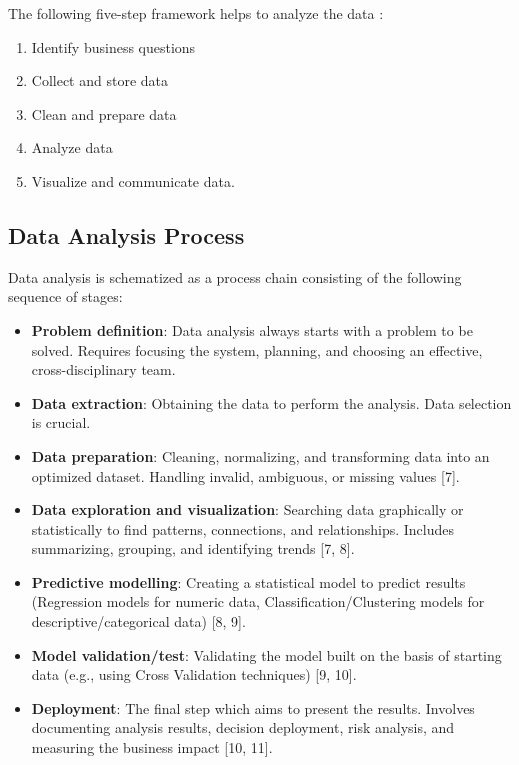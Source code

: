\documentclass[
  letterpaper,
  DIV=11,
  numbers=noendperiod]{scrreprt}
\providecommand{\tightlist}{%
  \setlength{\itemsep}{0pt}\setlength{\parskip}{0pt}}
\begin{document}
The following five-step framework helps to analyze the data :

\begin{enumerate}
\def\labelenumi{\arabic{enumi}.}
\tightlist
\item
  Identify business questions
\item
  Collect and store data
\item
  Clean and prepare data
\item
  Analyze data
\item
  Visualize and communicate data.
\end{enumerate}

\subsection{Data Analysis Process}\label{data-analysis-process}

Data analysis is schematized as a process chain consisting of the
following sequence of stages:

\begin{itemize}
\tightlist
\item
  \textbf{Problem definition}: Data analysis always starts with a
  problem to be solved. Requires focusing the system, planning, and
  choosing an effective, cross-disciplinary team.
\item
  \textbf{Data extraction}: Obtaining the data to perform the analysis.
  Data selection is crucial.
\item
  \textbf{Data preparation}: Cleaning, normalizing, and transforming
  data into an optimized dataset. Handling invalid, ambiguous, or
  missing values {[}7{]}.
\item
  \textbf{Data exploration and visualization}: Searching data
  graphically or statistically to find patterns, connections, and
  relationships. Includes summarizing, grouping, and identifying trends
  {[}7, 8{]}.
\item
  \textbf{Predictive modelling}: Creating a statistical model to predict
  results (Regression models for numeric data, Classification/Clustering
  models for descriptive/categorical data) {[}8, 9{]}.
\item
  \textbf{Model validation/test}: Validating the model built on the
  basis of starting data (e.g., using Cross Validation techniques) {[}9,
  10{]}.
\item
  \textbf{Deployment}: The final step which aims to present the results.
  Involves documenting analysis results, decision deployment, risk
  analysis, and measuring the business impact {[}10, 11{]}.
\end{itemize}
\end{document}

